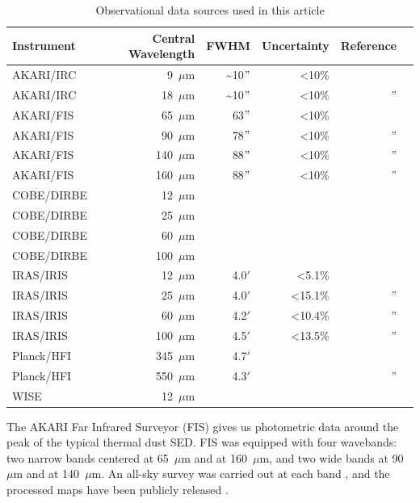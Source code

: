 \documentclass[preprint2,longabstract]{aastex}
\begin{document}
\begin{table}
\label{tab:data}
\caption{Observational data sources used in this article}
\centering
\begin{tabular}{lrrrrr}
\hline\hline
Instrument & Central Wavelength & FWHM & Uncertainty & Reference \\
\hline
AKARI/IRC & 9~$\mu$m  &  \~{}10$"$ & \textless 10\%   & \citep{ishihara10} \\
AKARI/IRC & 18~$\mu$m & \~{}10$"$  & \textless 10\%     & '' \\
AKARI/FIS & 65~$\mu$m  & 63$"$ & \textless 10\% & \citep{doi15,takita16} \\
AKARI/FIS & 90~$\mu$m  & 78$"$ & \textless 10\%   & '' \\
AKARI/FIS & 140~$\mu$m & 88$"$ & \textless 10\%   & '' \\
AKARI/FIS & 160~$\mu$m & 88$"$ & \textless 10\%   & '' \\
COBE/DIRBE & 12~$\mu$m & & & \\
COBE/DIRBE & 25~$\mu$m & & & \\
COBE/DIRBE & 60~$\mu$m & & & \\
COBE/DIRBE & 100~$\mu$m & & & \\
IRAS/IRIS & 12~$\mu$m   & 4.0$'$ &   \textless 5.1\%       & \citep{iris05} \\
IRAS/IRIS & 25~$\mu$m   & 4.0$'$ &    \textless 15.1\%      & ''\\
IRAS/IRIS & 60~$\mu$m   & 4.2$'$ &    \textless 10.4\%      & '' \\
IRAS/IRIS & 100~$\mu$m  & 4.5$'$ &   \textless 13.5\%       & '' \\
Planck/HFI & 345~$\mu$m & 4.7$'$ & & \citep{hfi14viii} \\
Planck/HFI & 550~$\mu$m & 4.3$'$& & '' \\
WISE & 12~$\mu$m & & & &  \\
\hline
\end{tabular}
\end{table}

    The AKARI Far Infrared Surveyor (FIS) gives us photometric data around the peak of the typical thermal dust SED. FIS was equipped with four wavebands: two narrow bands centered at 65~$\mu$m and at 160~$\mu$m, and two wide bands at 90~$\mu$m and at 140~$\mu$m. An all-sky survey was carried out at each band \citep{kawada07}, and the processed maps have been publicly released \citep{doi15}.
\end{document}
